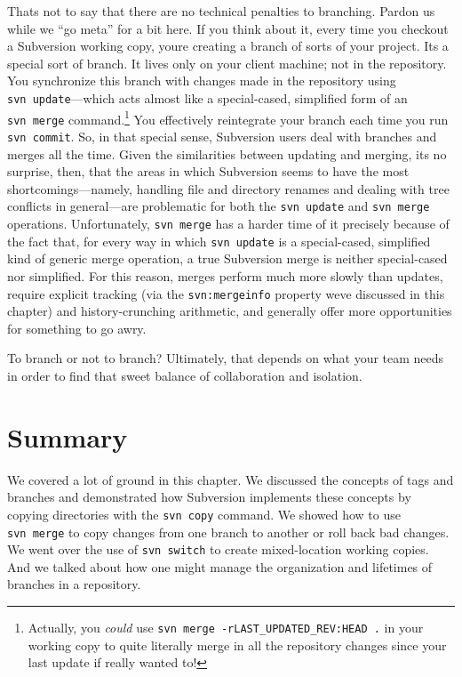That\textquotesingle s not to say that there are no technical penalties
to branching. Pardon us while we ``go meta'' for a bit here. If you
think about it, every time you checkout a Subversion working copy,
you\textquotesingle re creating a branch of sorts of your project.
It\textquotesingle s a special sort of branch. It lives only on your
client machine; not in the repository. You synchronize this branch with
changes made in the repository using \texttt{svn\ update}---which acts
almost like a special-cased, simplified form of an \texttt{svn\ merge}
command.\footnote{Actually, you \emph{could} use
  \texttt{svn\ merge\ -rLAST\_UPDATED\_REV:HEAD\ .} in your working copy
  to quite literally merge in all the repository changes since your last
  update if really wanted to!} You effectively reintegrate your branch
each time you run \texttt{svn\ commit}. So, in that special sense,
Subversion users deal with branches and merges all the time. Given the
similarities between updating and merging, it\textquotesingle s no
surprise, then, that the areas in which Subversion seems to have the
most shortcomings---namely, handling file and directory renames and
dealing with tree conflicts in general---are problematic for both the
\texttt{svn\ update} and \texttt{svn\ merge} operations. Unfortunately,
\texttt{svn\ merge} has a harder time of it precisely because of the
fact that, for every way in which \texttt{svn\ update} is a
special-cased, simplified kind of generic merge operation, a true
Subversion merge is neither special-cased nor simplified. For this
reason, merges perform much more slowly than updates, require explicit
tracking (via the \texttt{svn:mergeinfo} property we\textquotesingle ve
discussed in this chapter) and history-crunching arithmetic, and
generally offer more opportunities for something to go awry.

To branch or not to branch? Ultimately, that depends on what your team
needs in order to find that sweet balance of collaboration and
isolation.

\section{Summary}\label{svn.branchmerge.summary}

We covered a lot of ground in this chapter. We discussed the concepts of
tags and branches and demonstrated how Subversion implements these
concepts by copying directories with the \texttt{svn\ copy} command. We
showed how to use \texttt{svn\ merge} to copy changes from one branch to
another or roll back bad changes. We went over the use of
\texttt{svn\ switch} to create mixed-location working copies. And we
talked about how one might manage the organization and lifetimes of
branches in a repository.

